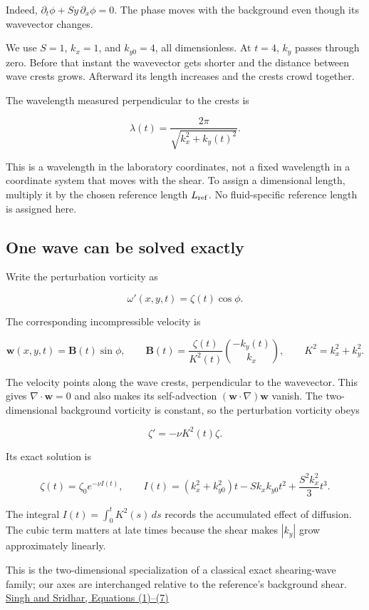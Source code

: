 \documentclass[
  english,
  11pt,
]{article}
\begin{document}
Indeed, \(\partial_t\phi+Sy\,\partial_x\phi=0\). The phase moves with
the background even though its wavevector changes.

We use \(S=1\), \(k_x=1\), and \(k_{y0}=4\), all dimensionless. At
\(t=4\), \(k_y\) passes through zero. Before that instant the wavevector
gets shorter and the distance between wave crests grows. Afterward its
length increases and the crests crowd together.

The wavelength measured perpendicular to the crests is

\[
\lambda(t)=\frac{2\pi}{\sqrt{k_x^2+k_y(t)^2}}.
\]

This is a wavelength in the laboratory coordinates, not a fixed
wavelength in a coordinate system that moves with the shear. To assign a
dimensional length, multiply it by the chosen reference length
\(L_{\rm ref}\). No fluid-specific reference length is assigned here.

\subsection{One wave can be solved
exactly}\label{one-wave-can-be-solved-exactly}

Write the perturbation vorticity as

\[
\omega'(x,y,t)=\zeta(t)\cos\phi.
\]

The corresponding incompressible velocity is

\[
\mathbf w(x,y,t)=\mathbf B(t)\sin\phi,\qquad
\mathbf B(t)=\frac{\zeta(t)}{K^2(t)}
\binom{-k_y(t)}{k_x},\qquad K^2=k_x^2+k_y^2.
\]

The velocity points along the wave crests, perpendicular to the
wavevector. This gives \(\nabla\cdot\mathbf w=0\) and also makes its
self-advection \((\mathbf w\cdot\nabla)\mathbf w\) vanish. The
two-dimensional background vorticity is constant, so the perturbation
vorticity obeys

\[
\zeta'=-\nu K^2(t)\zeta.
\]

Its exact solution is

\[
\zeta(t)=\zeta_0e^{-\nu I(t)},
\qquad
I(t)=
(k_x^2+k_{y0}^2)t
-Sk_xk_{y0}t^2
+\frac{S^2k_x^2}{3}t^3.
\]

The integral \(I(t)=\int_0^tK^2(s)\,ds\) records the accumulated effect
of diffusion. The cubic term matters at late times because the shear
makes \(|k_y|\) grow approximately linearly.

This is the two-dimensional specialization of a classical exact
shearing-wave family; our axes are interchanged relative to the
reference's background shear.
\href{https://arxiv.org/pdf/1101.5507v2}{Singh and Sridhar, Equations
(1)--(7)}
\end{document}
